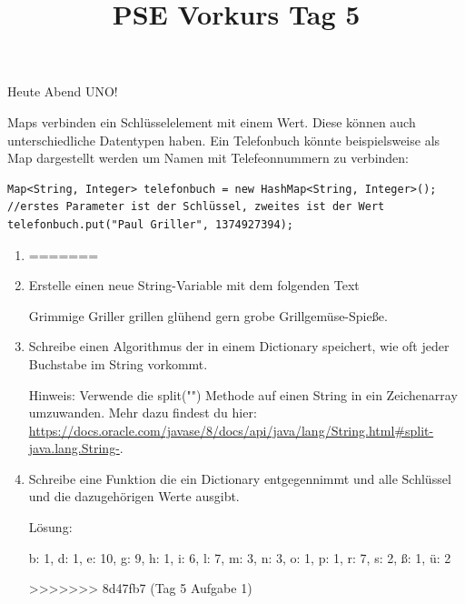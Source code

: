 \documentclass{../../sheet}
\title{PSE Vorkurs Tag 5}
\begin{document}
\maketitle
Heute Abend UNO!

\newpage
{}
Maps verbinden ein Schlüsselelement mit einem Wert. Diese können auch unterschiedliche Datentypen haben. Ein Telefonbuch könnte beispielsweise als Map dargestellt werden um Namen mit Telefeonnummern zu verbinden:
\begin{verbatim}
Map<String, Integer> telefonbuch = new HashMap<String, Integer>();
//erstes Parameter ist der Schlüssel, zweites ist der Wert
telefonbuch.put("Paul Griller", 1374927394);
\end{verbatim}

\begin{enumerate}
<<<<<<< HEAD
    \item
=======
    \item Erstelle einen neue String-Variable mit dem folgenden Text
    \begin{ausgabe}
        Grimmige Griller grillen glühend gern grobe Grillgemüse-Spieße.
    \end{ausgabe}
    \item Schreibe einen Algorithmus der in einem Dictionary speichert, wie oft jeder Buchstabe im String vorkommt. 

    Hinweis: Verwende die split("") Methode auf einen String in ein Zeichenarray umzuwanden. Mehr dazu findest du hier: \url{https://docs.oracle.com/javase/8/docs/api/java/lang/String.html#split-java.lang.String-}.

    \item Schreibe eine Funktion die ein Dictionary entgegennimmt und alle Schlüssel und die dazugehörigen Werte ausgibt.
    
    Lösung:
    \begin{ausgabe}
        b: 1, d: 1, e: 10, g: 9, h: 1, i: 6, l: 7, m: 3, n: 3, o: 1, p: 1, r: 7, s: 2, ß: 1, ü: 2
    \end{ausgabe}
>>>>>>> 8d47fb7 (Tag 5 Aufgabe 1)
\end{enumerate}
\end{document}
